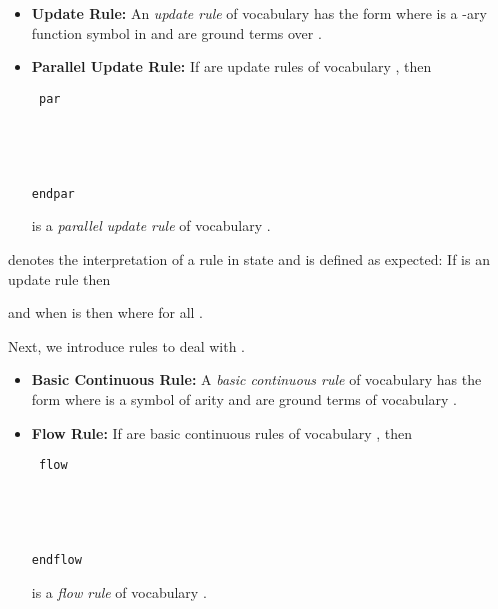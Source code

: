 \documentclass[envcountsame]{llncs}
\newenvironment{ttcode}{\begin{ttfamily}\rm\tt}{\end{ttfamily}}
\newcommand\s{\phantom{x}}
\begin{document}
\begin{definition}\begin{itemize}
\item \textbf{Update Rule:}  An \emph{update rule} of vocabulary  has the
  form  where  is a -ary function symbol
  in  and  are ground terms over .



\item \textbf{Parallel Update Rule: }
If  are update rules of vocabulary , then
\begin{center}
\begin{minipage}{8cm}
\begin{ttcode}
par \\
\s  \\
\s    \\ 
\s  \\ 
\s   \\
endpar \\ 
\end{ttcode}
\end{minipage}
\end{center}
is a \emph{parallel update rule} of vocabulary .
\end{itemize}
\end{definition}

 denotes the interpretation of a rule  in state 
and is defined as expected: If  is an update rule  then

and when  is  then  where  for all .

Next, we introduce rules to deal with .

\begin{definition}\begin{itemize}
\item \textbf{Basic Continuous Rule:}
  A \emph{basic continuous rule} of vocabulary  has the
  form  where  is a symbol of arity   and  are ground terms of vocabulary .





\item \textbf{Flow Rule:}
If  are basic continuous rules of vocabulary , then
  \begin{center}
  \begin{minipage}{8cm}
\begin{ttcode}
flow \\ 
\s  \\ 
\s   \\
\s   \\ 
\s  \\ 
endflow \\ 
\end{ttcode}
  \end{minipage}
   \end{center}
is a \emph{flow rule} of vocabulary .
\end{itemize}
\end{definition}
\end{document}
